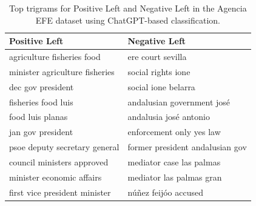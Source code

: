 \documentclass[12pt]{article}
\begin{document}
	\begin{table}[!htb]
		\centering
		\begin{tabular}{|l|l|}
			\hline
			Positive Left & Negative Left \\
			\hline
			agriculture fisheries food & ere court sevilla \\
			minister agriculture fisheries & social rights ione \\
			dec gov president & social ione belarra \\
			fisheries food luis & andalusian government josé \\
			food luis planas & andalusia josé antonio \\
			jan gov president & enforcement only yes law \\
			psoe deputy secretary general & former president andalusian gov \\
			council ministers approved & mediator case las palmas \\
			minister economic affairs & mediator las palmas gran \\
			first vice president minister & núñez feijóo accused \\
			\hline
		\end{tabular}
		\caption{Top trigrams for Positive Left and Negative Left in the Agencia EFE dataset using ChatGPT-based classification.}
		\label{tab:top_words_pos_left_neg_left}
	\end{table}
	
	
	
	
	
	
\clearpage
	
\end{document}
